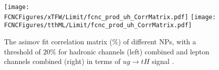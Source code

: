 \begin{figure}[H]
\centering
\texttt{[image: \\FCNCFigures/xTFW/Limit/fcnc\_prod\_uh\_CorrMatrix.pdf]}
\texttt{[image: \\FCNCFigures/tthML/Limit/fcnc\_prod\_uh\_CorrMatrix.pdf]}
\caption{ The asimov fit correlation matrix ($\%$) of different NPs, with a threshold of $20\%$ for hadronic channels (left) combined and lepton channels combined (right) in terms of $ug\to tH$ signal . }
\label{fig:fcnc_prod_uh_CorrMatrix}
\end{figure}

\newpage